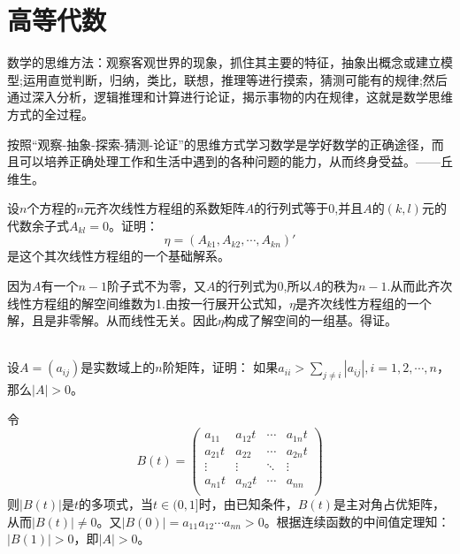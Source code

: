 \chapter{高等代数}
数学的思维方法：观察客观世界的现象，抓住其主要的特征，抽象出概念或建立模型;运用直觉判断，归纳，类比，联想，推理等进行摸索，猜测可能有的规律;然后通过深入分析，逻辑推理和计算进行论证，揭示事物的内在规律，这就是数学思维方式的全过程。

按照“观察-抽象-探索-猜测-论证”的思维方式学习数学是学好数学的正确途径，而且可以培养正确处理工作和生活中遇到的各种问题的能力，从而终身受益。——丘维生。


\begin{exercise}
\hfill
设$n$个方程的$n$元齐次线性方程组的系数矩阵$A$的行列式等于0,并且$A$的$(k,l)$元的代数余子式$A_{kl}=0$。证明：$$\eta=(A_{k1},A_{k2},\cdots,A_{kn})'$$是这个其次线性方程组的一个基础解系。


因为$A$有一个$n-1$阶子式不为零，又$A$的行列式为0,所以$A$的秩为$n-1$.从而此齐次线性方程组的解空间维数为1.由按一行展开公式知，$\eta$是齐次线性方程组的一个解，且是非零解。从而线性无关。因此$\eta$构成了解空间的一组基。得证。
\end{exercise}
\begin{exercise}
\hfill\\
设$A=(a_{ij})$是实数域上的$n$阶矩阵，证明：
如果$a_{ii}>\sum_{j\not=i}|a_{ij}|,i=1,2,\cdots,n$，那么$|A|>0$。

令
$$
B(t)=
\left(
\begin{array}{llll}
a_{11}&a_{12}t&\cdots&a_{1n}t\\
a_{21}t&a_{22}&\cdots&a_{2n}t\\
\vdots&\vdots&\ddots&\vdots\\
a_{n1}t&a_{n2}t&\cdots&a_{nn}\\
\end{array}
\right)
$$
则$|B(t)|$是$t$的多项式，当$t\in(0,1]$时，由已知条件，$B(t)$是主对角占优矩阵，从而$|B(t)|\neq0$。又$|B(0)|=a_{11}a_{12}\cdots a_{nn}>0$。根据连续函数的中间值定理知：$|B(1)|>0$，即$|A|>0$。
\end{exercise}
\hfill\\
